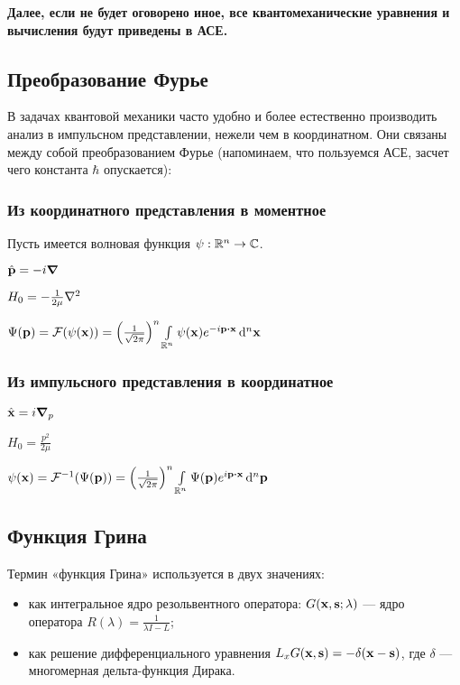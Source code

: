 \textbf{Далее, если не будет оговорено иное, все квантомеханические уравнения и вычисления будут приведены в АСЕ.}

\subsection{Преобразование Фурье}
В задачах квантовой механики часто удобно и более естественно производить анализ в импульсном представлении, нежели чем в координатном. Они связаны между собой преобразованием Фурье (напоминаем, что пользуемся АСЕ, засчет чего константа $\hbar$ опускается):

\subsubsection{Из координатного представления в моментное}
Пусть имеется волновая функция $\psi: \mathbb{R}^n \to \mathbb{C}$. 

$\hat{\vb{p}} = -i \grad$

$H_0 = - \frac{1}{2 \mu} \laplacian$

$\Psi(\vb{p}) = \mcF(\psi(\vb{x})) = \left(\frac{1}{\sqrt{2 \pi}}\right)^n \int\limits_{\bbR^n} \psi(\vb{x}) e^{-i \vb{p} \vdot \vb{x}} \dd[n]{\vb{x}}$

\subsubsection{Из импульсного представления в координатное}

$\hat{\vb{x}} = i \grad_p$

$H_0 = \frac{p^2}{2 \mu}$

$\psi(\vb{x}) = \mcF^{-1}(\Psi(\vb{p})) = \left(\frac{1}{\sqrt{2 \pi}}\right)^n \int\limits_{\bbR^n} \Psi(\vb{p}) e^{i \vb{p} \vdot \vb{x}} \dd[n]{\vb{p}}$

\subsection{Функция Грина}
Термин «функция Грина» используется в двух значениях:

\begin{itemize}
\item как интегральное ядро резольвентного оператора: $G(\vb{x}, \vb{s}; \lambda)$ — ядро оператора $R(\lambda) = \frac{1}{\lambda I - L}$;
\item как решение дифференциального уравнения $L_x G(\vb{x}, \vb{s}) = -\delta(\vb{x} - \vb{s})$, где $\delta$ — многомерная дельта-функция Дирака.
\end{itemize}

